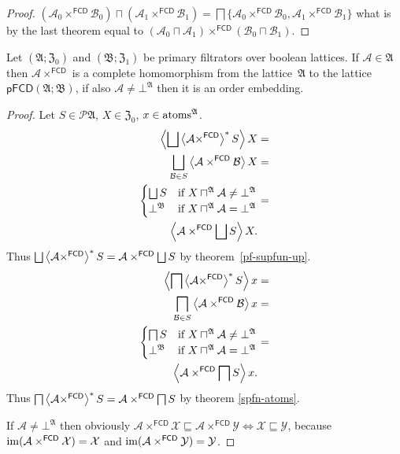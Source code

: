 \begin{proof}
$(\mathcal{A}_{0}\times^{\mathsf{FCD}}\mathcal{B}_{0})\sqcap(\mathcal{A}_{1}\times^{\mathsf{FCD}}\mathcal{B}_{1})=\bigsqcap\{\mathcal{A}_{0}\times^{\mathsf{FCD}}\mathcal{B}_{0},\mathcal{A}_{1}\times^{\mathsf{FCD}}\mathcal{B}_{1}\}$
what is by the last theorem equal to $(\mathcal{A}_{0}\sqcap\mathcal{A}_{1})\times^{\mathsf{FCD}}(\mathcal{B}_{0}\sqcap\mathcal{B}_{1})$.\end{proof}
\begin{thm}
Let $(\mathfrak{A};\mathfrak{Z}_{0})$ and $(\mathfrak{B};\mathfrak{Z}_{1})$
be primary filtrators over boolean lattices. If $\mathcal{A}\in\mathfrak{A}$
then $\mathcal{A}\times^{\mathsf{FCD}}$ is a complete homomorphism
from the lattice~$\mathfrak{A}$ to the lattice $\mathsf{pFCD}(\mathfrak{A};\mathfrak{B})$,
if also $\mathcal{A}\neq\bot^{\mathfrak{A}}$ then it is an order
embedding.\end{thm}
\begin{proof}
Let $S\in\mathscr{P}\mathfrak{A}$, $X\in\mathfrak{Z}_{0}$, $x\in\operatorname{atoms}^{\mathfrak{A}}$.
\begin{align*}
\supfun{\bigsqcup\rsupfun{\mathcal{A}\times^{\mathsf{FCD}}}S}X & =\\
\bigsqcup_{\mathcal{B}\in S}\supfun{\mathcal{A}\times^{\mathsf{FCD}}\mathcal{B}}X & =\\
\begin{cases}
\bigsqcup S & \text{if }X\sqcap^{\mathfrak{A}}\mathcal{A}\ne\bot^{\mathfrak{A}}\\
\bot^{\mathfrak{B}} & \text{if }X\sqcap^{\mathfrak{A}}\mathcal{A}=\bot^{\mathfrak{A}}
\end{cases} & =\\
\supfun{\mathcal{A}\times^{\mathsf{FCD}}\bigsqcup S}X.
\end{align*}
Thus $\bigsqcup\rsupfun{\mathcal{A}\times^{\mathsf{FCD}}}S=\mathcal{A}\times^{\mathsf{FCD}}\bigsqcup S$
by theorem~\ref{pf-supfun-up}.
\begin{align*}
\left\langle \bigsqcap\left\langle \mathcal{A}\times^{\mathsf{FCD}}\right\rangle ^{\ast}S\right\rangle x & =\\
\bigsqcap_{\mathcal{B}\in S}\left\langle \mathcal{A}\times^{\mathsf{FCD}}\mathcal{B}\right\rangle x & =\\
\begin{cases}
\bigsqcap S & \text{if }X\sqcap^{\mathfrak{A}}\mathcal{A}\ne\bot^{\mathfrak{A}}\\
\bot^{\mathfrak{B}} & \text{if }X\sqcap^{\mathfrak{A}}\mathcal{A}=\bot^{\mathfrak{A}}
\end{cases} & =\\
\left\langle \mathcal{A}\times^{\mathsf{FCD}}\bigsqcap S\right\rangle x.
\end{align*}
Thus $\bigsqcap\left\langle \mathcal{A}\times^{\mathsf{FCD}}\right\rangle ^{\ast}S=\mathcal{A}\times^{\mathsf{FCD}}\bigsqcap S$
by theorem \ref{spfn-atoms}.

If $\mathcal{A}\neq\bot^{\mathfrak{A}}$ then obviously
$\mathcal{A}\times^{\mathsf{FCD}}\mathcal{X}\sqsubseteq\mathcal{A}\times^{\mathsf{FCD}}\mathcal{Y} \Leftrightarrow
\mathcal{X}\sqsubseteq\mathcal{Y}$, because $\operatorname{im}(\mathcal{A}\times^{\mathsf{FCD}}\mathcal{X})=\mathcal{X}$ and
$\operatorname{im}(\mathcal{A}\times^{\mathsf{FCD}}\mathcal{Y})=\mathcal{Y}$.\end{proof}
